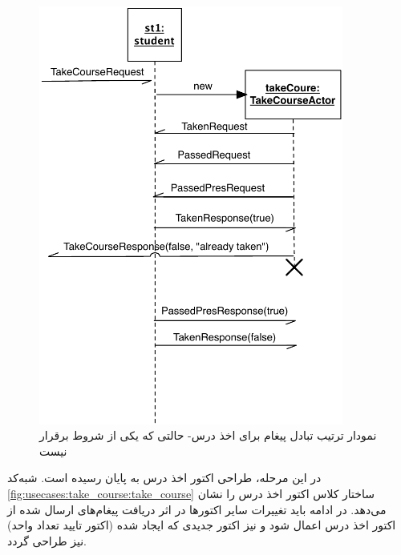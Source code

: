 \begin{figure}
    \begin{center}
	\includegraphics[width=10cm]{4-ProposedFramework/Figures/take_course_seq2.pdf}
    \end{center}
    \caption{\label{fig:take_course_sequence_2} نمودار ترتیب تبادل پیغام‌ برای اخذ درس- حالتی که یکی از شروط برقرار نیست }
\end{figure}


 در این مرحله، طراحی اکتور اخذ درس به پایان رسیده است. شبه‌کد \ref{fig:usecases:take_course:take_course} ساختار کلاس اکتور اخذ درس را نشان می‌دهد.
  در ادامه باید تغییرات سایر اکتورها در اثر دریافت پیغام‌های ارسال شده از اکتور اخذ درس اعمال شود و نیز اکتور جدیدی که ایجاد شده (اکتور تایید تعداد واحد) نیز طراحی گردد.
